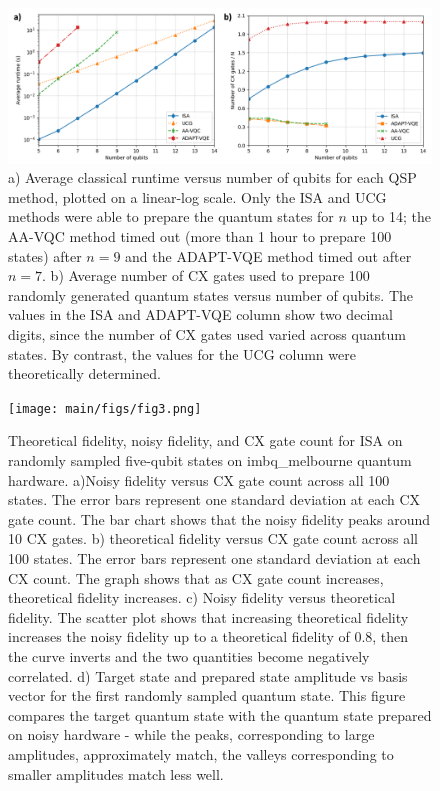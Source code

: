 \begin{figure}[h]
\centering
\includegraphics[width=0.95\linewidth]{main/figs/fig2.png}
\caption{a) Average classical runtime versus number of qubits for each QSP method,
plotted on a linear-log scale. Only the ISA and UCG methods were able to prepare
the quantum states for $n$ up to 14; the AA-VQC method timed out (more than 1 hour
to prepare 100 states) after $n = 9$ and the ADAPT-VQE method timed out after
$n=7$. b) Average number of CX gates used to prepare 100 randomly generated quantum states versus number of qubits. The values in the ISA and ADAPT-VQE column show two decimal digits, since the number of CX gates used varied across quantum states. By contrast, the values for the UCG column were theoretically determined.}
\label{fig2}
\end{figure}

\begin{figure}[h]
\centering
\texttt{[image: main/figs/fig3.png]}
\caption{Theoretical fidelity, noisy fidelity, and CX gate count for ISA on randomly
sampled five-qubit states on imbq\_melbourne quantum hardware. a)Noisy fidelity versus CX gate count across all 100 states. The error bars represent one
standard deviation at each CX gate count. The bar chart shows that the noisy fidelity
peaks around 10 CX gates. b) theoretical fidelity
versus CX gate count across all 100 states. The error bars represent one standard
deviation at each CX count. The graph shows that as CX gate count increases,
theoretical fidelity increases. c) Noisy fidelity
versus theoretical fidelity. The scatter plot shows that increasing theoretical fidelity
increases the noisy fidelity up to a theoretical fidelity of 0.8, then the curve
inverts and the two quantities become negatively correlated. d) Target state and prepared state amplitude vs basis
vector for the first randomly sampled quantum state. This figure compares the target quantum state
with the quantum state prepared on noisy hardware - while the peaks, corresponding
to large amplitudes, approximately match, the valleys corresponding to smaller 
amplitudes match less well.}
\label{fig3}
\end{figure}




